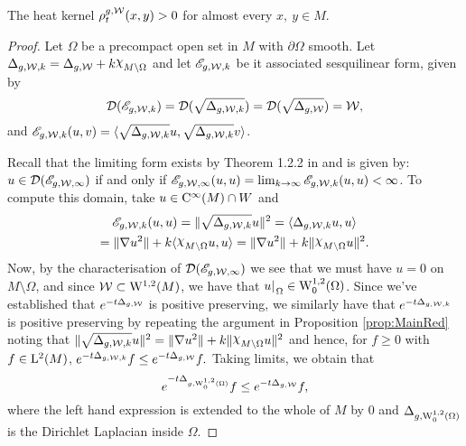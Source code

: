 \documentclass[a4paper, 12pt]{amsart}
\begin{document}
\begin{prop}
\label{prop:hkpos}
The heat kernel $\hk^{g,\cW}_t(x,y) > 0$ for almost every 
$x,\ y \in M$.
\end{prop}
\begin{proof}
Let $\Omega$ be a precompact open set in $M$ with $\partial \Omega$
smooth. Let $\Delta_{g,\cW,k} = \Delta_{g,\cW} + k \ind{M \setminus \Omega}$
and let $\sE_{g,\cW,k}$ be it associated sesquilinear
form, given by 
$$\dom(\sE_{g,\cW,k}) = \dom(\sqrt{\Delta_{g,\cW,k}}) 
	= \dom(\sqrt{\Delta_{g,\cW}}) = \cW,$$
and $\sE_{g,\cW,k}(u,v) = \inprod{\sqrt{\Delta_{g,\cW,k}} u, \sqrt{\Delta_{g,\cW,k}}v}$. 

Recall that the limiting form exists by Theorem 1.2.2 
in \cite{Davies} and is given by: 
$u \in \dom(\sE_{g,\cW,\infty})$ if and only if
$\sE_{g,\cW,\infty}(u,u) = \lim_{k\to\infty} \sE_{g,\cW,k}(u,u) < \infty$. 
To compute this domain, take $u \in \Ck{\infty}(M) \intersect W$
and 
\begin{multline*} 
\sE_{g,\cW,k}(u,u) = \norm{\sqrt{\Delta_{g,\cW,k}}u}^2
	= \inprod{\Delta_{g,\cW,k}u,u} \\
	= \norm{\nabla u^2} + k \inprod{\ind{M \setminus \Omega} u, u}
	= \norm{\nabla u^2} + k \norm{\ind{M \setminus \Omega} u}^2.
\end{multline*}
Now, by the characterisation of $\dom(\sE_{g,\cW,\infty})$
we see that we must have $u = 0$ on $M \setminus \Omega$,
and since $\cW \subset \SobH{1}(M)$, we have that
$u\rest{\Omega} \in \SobH[0]{1}(\Omega)$. 
Since we've established that $e^{-t{\Delta_{g,\cW}}}$
is positive preserving, we similarly have that 
$e^{-t {\Delta_{g,\cW,k}}}$ is positive preserving
by repeating the argument in Proposition \ref{prop:MainRed}
noting that 
$\norm{\sqrt{\Delta_{g,\cW,k}}u}^2 
	= \norm{\nabla u^2} + k \norm{\ind{M \setminus \Omega} u}^2$
and hence, for $f \geq 0$ with $f \in \Lp{2}(M)$,
$ e^{-t{\Delta_{g,\cW,k}}}f \leq e^{-t{\Delta_{g,\cW}}}f.$
Taking limits, we obtain that 
$$e^{-t{\Delta_{g,\SobH[0]{1}(\Omega)}}}f
	\leq e^{-t{\Delta_{g,\cW}}}f,$$
where the left hand expression is extended
to the whole of $M$ by $0$ 
and $\Delta_{g,\SobH[0]{1}(\Omega)}$ is the Dirichlet
Laplacian inside $\Omega$.


\end{proof}
\end{document}

